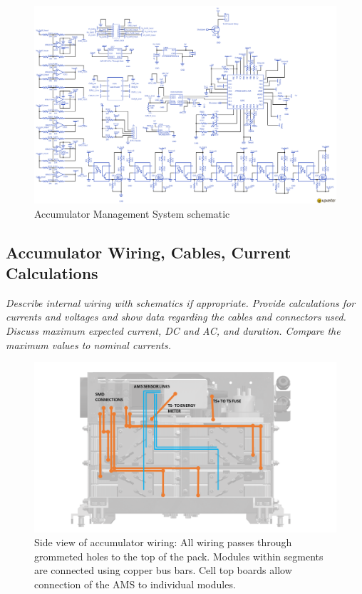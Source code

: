 \documentclass{article}
\begin{document}
        \begin{figure}
            \includegraphics[width=\textheight]{bmsschem}
            \caption{Accumulator Management System schematic}
            \label{amsschem}
        \end{figure}


\newpage

\subsection{Accumulator Wiring, Cables, Current Calculations}

    \textit{Describe internal wiring with schematics if appropriate. Provide calculations for currents and voltages and show data regarding the cables and connectors used. Discuss maximum expected current, DC and AC, and duration. Compare the maximum values to nominal currents.}

        \begin{figure}[H]
            \centering
            \includegraphics[width = 0.9 \textwidth]{ACCUMULATOR_WIRING_SIDE}
            \caption{Side view of accumulator wiring: All wiring passes through grommeted holes to the top of the pack. Modules within segments are connected using copper bus bars. Cell top boards allow connection of the AMS to individual modules.}
            \label{ACCUMULATOR_WIRING_SIDE}
        \end{figure}
\end{document}
